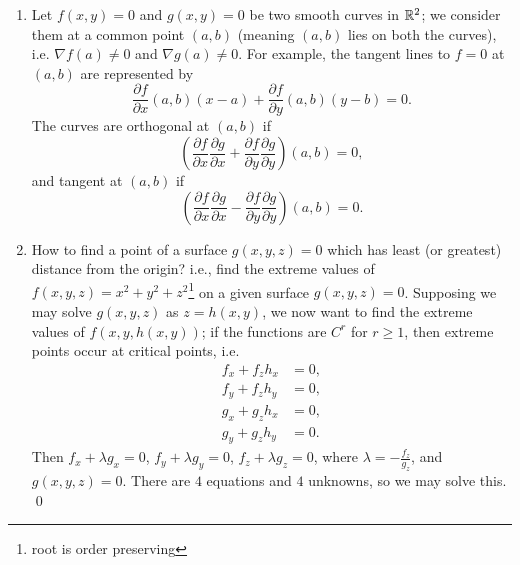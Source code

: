 \begin{enumerate}[label=(\alph*)]
    \item Let $f(x, y) = 0$ and $g(x, y) = 0$ be two smooth curves in $\mathbb R^2$; we consider them at a common point $(a, b)$ (meaning $(a, b)$ lies on both the curves), i.e. $\nabla f(a) \neq 0$ and $\nabla g(a) \neq 0$. For example, the tangent lines to $f = 0$ at $(a, b)$ are represented by
    \[ \frac{\partial f}{\partial x}(a, b)(x - a) + \frac{\partial f}{\partial y}(a, b)(y - b) = 0. \]
    The curves are orthogonal at $(a, b)$ if
    \[ \left( \frac{\partial f}{\partial x} \frac{\partial g}{\partial x} + \frac{\partial f}{\partial y} \frac{\partial g}{\partial y} \right)(a, b) = 0, \]
    and tangent at $(a, b)$ if
    \[ \left( \frac{\partial f}{\partial x} \frac{\partial g}{\partial x} - \frac{\partial f}{\partial y} \frac{\partial g}{\partial y} \right)(a, b) = 0. \]
    \item How to find a point of a surface $g(x, y, z) = 0$ which has least (or greatest) distance from the origin? i.e., find the extreme values of $f(x, y, z) = x^2 + y^2 + z^2$\footnote{root is order preserving} on a given surface $g(x, y, z) = 0$. Supposing we may solve $g(x, y, z)$ as $z = h(x, y)$, we now want to find the extreme values of $f(x, y, h(x, y))$; if the functions are $C^r$ for $r \geq 1$, then extreme points occur at critical points, i.e.
    \begin{align*}
        f_x + f_zh_x &= 0, \\ 
        f_y + f_zh_y &= 0, \\
        g_x + g_zh_x &= 0, \\
        g_y + g_zh_y &= 0.
    \end{align*}
    Then $f_x + \lambda g_x = 0$, $f_y + \lambda g_y = 0$, $f_z + \lambda g_z = 0$, where $\lambda = -\frac{f_z}{g_z}$, and $g(x, y, z) = 0$. There are $4$ equations and $4$ unknowns, so we may solve this. \qed
\end{enumerate}
